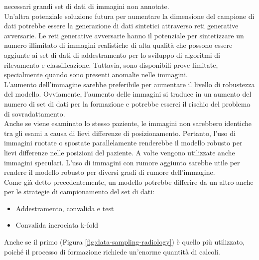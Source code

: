\documentclass[12pt,a4paper]{report}
\begin{document}
necessari grandi set di dati di immagini non annotate.\\
Un'altra potenziale soluzione futura per aumentare la dimensione del campione di dati potrebbe essere la generazione di dati 
sintetici attraverso reti generative avversarie. Le reti generative avversarie hanno il potenziale per sintetizzare un numero
illimitato di immagini realistiche di alta qualità che possono essere aggiunte ai set di dati di addestramento per lo sviluppo di 
algoritmi di rilevamento e classificazione. Tuttavia, sono disponibili prove limitate, specialmente quando sono presenti anomalie nelle immagini.\\
L'aumento dell'immagine sarebbe preferibile per aumentare il livello di robustezza del modello. Ovviamente, l'aumento delle immagini si traduce in un aumento del numero di set di dati per la formazione e potrebbe esserci il rischio del problema di sovradattamento.\\
Anche se viene esaminato lo stesso paziente, le immagini non sarebbero identiche tra gli esami a causa di lievi differenze di posizionamento. 
Pertanto, l'uso di immagini ruotate o spostate parallelamente renderebbe il modello robusto per lievi differenze nelle posizioni del paziente. A volte vengono utilizzate anche immagini speculari. L'uso di immagini con rumore aggiunto sarebbe utile per rendere il modello robusto per diversi gradi di rumore dell'immagine.\\

Come già detto precedentemente, un modello potrebbe differire da un altro anche per le strategie di campionamento del set di dati:
\begin{itemize}
    \item Addestramento, convalida e test
    \item Convalida incrociata k-fold
\end{itemize}
Anche se il primo (Figura \ref{fig:data-sampling-radiology}) è quello più utilizzato, poiché il processo di formazione richiede un'enorme quantità di calcoli.\\
\end{document}
